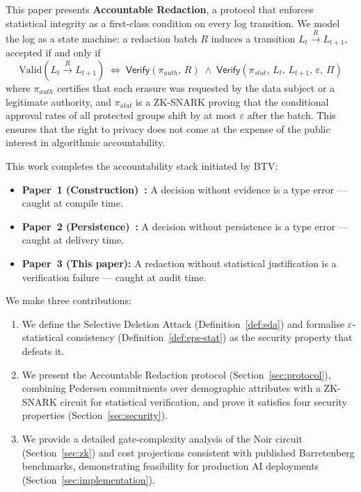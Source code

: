 This paper presents \textbf{Accountable Redaction}, a protocol that
enforces statistical integrity as a first-class condition on every log
transition. We model the log as a state machine: a redaction batch $R$
induces a transition $L_t \xrightarrow{R} L_{t+1}$, accepted if and
only if
\[
  \text{Valid}\!\left(L_t \xrightarrow{R} L_{t+1}\right) \;\iff\;
  \mathsf{Verify}(\pi_{\mathit{auth}},\, R)
  \;\land\;
  \mathsf{Verify}(\pi_{\mathit{stat}},\, L_t,\, L_{t+1},\, \varepsilon,\, \Pi)
\]
where $\pi_{\mathit{auth}}$ certifies that each erasure was requested by
the data subject or a legitimate authority, and $\pi_{\mathit{stat}}$ is
a ZK-SNARK proving that the conditional approval rates of all protected
groups shift by at most $\varepsilon$ after the batch. This ensures that
the right to privacy does not come at the expense of the public interest
in algorithmic accountability.

This work completes the accountability stack initiated by BTV:
\begin{itemize}
  \item \textbf{Paper~1 (Construction)~\cite{btv2026}:} A decision
  without evidence is a type error --- caught at compile time.
  \item \textbf{Paper~2 (Persistence)~\cite{btv-t-repo}:} A decision
  without persistence is a type error --- caught at delivery time.
  \item \textbf{Paper~3 (This paper):} A redaction without statistical
  justification is a verification failure --- caught at audit time.
\end{itemize}

We make three contributions:
\begin{enumerate}
  \item We define the Selective Deletion Attack
  (Definition~\ref{def:sda}) and formalise $\varepsilon$-statistical
  consistency (Definition~\ref{def:eps-stat}) as the security property
  that defeats it.
  \item We present the Accountable Redaction protocol
  (Section~\ref{sec:protocol}), combining Pedersen commitments over
  demographic attributes with a ZK-SNARK circuit for statistical
  verification, and prove it satisfies four security properties
  (Section~\ref{sec:security}).
  \item We provide a detailed gate-complexity analysis of the Noir
  circuit (Section~\ref{sec:zk}) and cost projections consistent with
  published Barretenberg benchmarks, demonstrating feasibility for
  production AI deployments (Section~\ref{sec:implementation}).
\end{enumerate}
